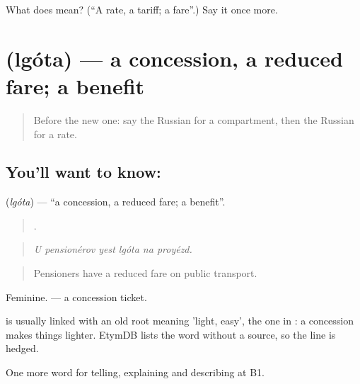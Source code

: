 \begin{tcolorbox}[breakable,colback=teal!4,colframe=teal!35!black,title={Before you move on}]
What does  mean? (\textquotedblleft{}A rate, a tariff; a fare\textquotedblright{}.) Say it once more.
\end{tcolorbox}
\section[\texorpdfstring{\ru{льгота} (lgóta)}{льгота (lgóta)}]{ (lgóta) — a concession, a reduced fare; a benefit}

\label{lesson:RU-C413-lgota}



\begin{quote}
Before the new one: say the Russian for a compartment, then the Russian for a rate.
\end{quote}

\subsection*{You'll want to know: }
\textbf{} (\emph{lgóta}) — \textquotedblleft{}a concession, a reduced fare; a benefit\textquotedblright{}.

\begin{quote}
     .
\end{quote}

\begin{quote}
\emph{U pensionérov yest lgóta na proyézd.}
\end{quote}

\begin{quote}
Pensioners have a reduced fare on public transport.
\end{quote}

Feminine. \emph{ } — a concession ticket.

\begin{cousinweb}
\emph{} is usually linked with an old root meaning 'light, easy', the one in \emph{}: a concession makes things lighter. EtymDB lists the word without a source, so the line is hedged.
\end{cousinweb}

\begin{grammarlens}[title={What you've built}]
One more word for telling, explaining and describing at B1.
\end{grammarlens}


